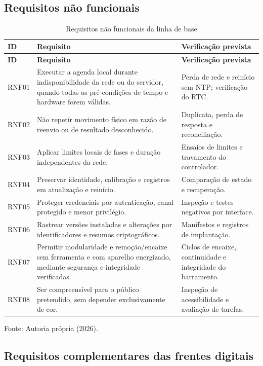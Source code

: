 \subsection{Requisitos não funcionais}

{\small\setlength{\tabcolsep}{3pt}\begin{longtable}{p{}p{}p{}}\caption{Requisitos não funcionais da linha de base}\label{tab:05-2}\\
\hline
\textbf{ID} & \textbf{Requisito} & \textbf{Verificação prevista}\\\hline
\endfirsthead\hline
\textbf{ID} & \textbf{Requisito} & \textbf{Verificação prevista}\\\hline
\endhead
RNF01 & Executar a agenda local durante indisponibilidade da rede ou do servidor, quando todas as pré-condições de tempo e hardware forem válidas. & Perda de rede e reinício sem NTP; verificação do RTC.\\\hline
RNF02 & Não repetir movimento físico em razão de reenvio ou de resultado desconhecido. & Duplicata, perda de resposta e reconciliação.\\\hline
RNF03 & Aplicar limites locais de fases e duração independentes da rede. & Ensaios de limites e travamento do controlador.\\\hline
RNF04 & Preservar identidade, calibração e registros em atualização e reinício. & Comparação de estado e recuperação.\\\hline
RNF05 & Proteger credenciais por autenticação, canal protegido e menor privilégio. & Inspeção e testes negativos por interface.\\\hline
RNF06 & Rastrear versões instaladas e alterações por identificadores e resumos criptográficos. & Manifestos e registros de implantação.\\\hline
RNF07 & Permitir modularidade e remoção/encaixe sem ferramenta e com aparelho energizado, mediante segurança e integridade verificadas. & Ciclos de encaixe, continuidade e integridade do barramento.\\\hline
RNF08 & Ser compreensível para o público pretendido, sem depender exclusivamente de cor. & Inspeção de acessibilidade e avaliação de tarefas.\\\hline
\end{longtable}}{\small\noindent Fonte: Autoria própria (2026).\par}


\subsection{Requisitos complementares das frentes digitais}

